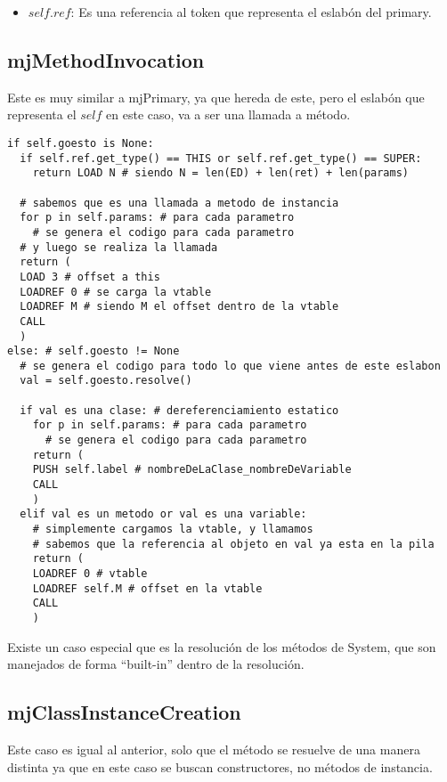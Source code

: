 \documentclass [a4paper,abstracton,titlepage]{scrartcl}
\begin{document}

  \begin{itemize}
   \item $self.ref$: Es una referencia al token que representa el eslabón del
primary.
  \end{itemize}

  \subsection{mjMethodInvocation}

Este es muy similar a mjPrimary, ya que hereda de este, pero el eslabón que
representa el $self$ en este caso, va a ser una llamada a método.

\begin{lstlisting}
if self.goesto is None:
  if self.ref.get_type() == THIS or self.ref.get_type() == SUPER:
    return LOAD N # siendo N = len(ED) + len(ret) + len(params)
  
  # sabemos que es una llamada a metodo de instancia
  for p in self.params: # para cada parametro
    # se genera el codigo para cada parametro
  # y luego se realiza la llamada
  return (
  LOAD 3 # offset a this
  LOADREF 0 # se carga la vtable
  LOADREF M # siendo M el offset dentro de la vtable
  CALL
  )
else: # self.goesto != None
  # se genera el codigo para todo lo que viene antes de este eslabon
  val = self.goesto.resolve() 

  if val es una clase: # dereferenciamiento estatico
    for p in self.params: # para cada parametro
      # se genera el codigo para cada parametro
    return (
    PUSH self.label # nombreDeLaClase_nombreDeVariable
    CALL
    )
  elif val es un metodo or val es una variable: 
    # simplemente cargamos la vtable, y llamamos
    # sabemos que la referencia al objeto en val ya esta en la pila
    return (
    LOADREF 0 # vtable
    LOADREF self.M # offset en la vtable
    CALL
    )
\end{lstlisting}

Existe un caso especial que es la resolución de los métodos de System, que son manejados de forma ``built-in'' dentro de la resolución. 

  \subsection{mjClassInstanceCreation}

Este caso es igual al anterior, solo que el método se resuelve de una manera
distinta ya que en este caso se buscan constructores, no métodos de instancia.
\end{document}
